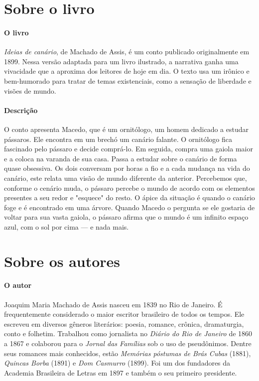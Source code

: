 \documentclass[11pt]{extarticle}
\begin{document}
\section{Sobre o livro}

\paragraph{O livro} \textit{Ideias de canário}, de Machado de Assis, é um conto publicado originalmente em 1899. Nessa versão adaptada para um livro ilustrado, a narrativa ganha uma vivacidade que a aproxima dos leitores de hoje em dia. O texto usa um irônico e bem-humorado para tratar de temas existenciais, como a sensação de liberdade e visões de mundo.

\paragraph{Descrição} O conto apresenta Macedo, que é um ornitólogo, um homem dedicado a estudar pássaros. Ele encontra em um brechó um canário falante. O ornitólogo fica fascinado pelo pássaro e decide comprá-lo. Em seguida, compra uma gaiola maior e a coloca na varanda de sua casa. Passa a estudar sobre o canário de forma quase obsessiva. Os dois conversam por horas a fio e a cada mudança na vida do canário, este relata uma visão de mundo diferente da anterior. Percebemos que, conforme o cenário muda, o pássaro percebe o mundo de acordo com os elementos presentes a seu redor e "esquece" do resto. O ápice da situação é quando o canário foge e é encontrado em uma árvore. Quando Macedo o pergunta se ele gostaria de voltar para sua vasta gaiola, o pássaro afirma que o mundo é um infinito espaço azul, com o sol por cima --- e nada mais.

\section{Sobre os autores}

\paragraph{O autor} Joaquim Maria Machado de Assis nasceu em 1839 no Rio de Janeiro. É frequentemente considerado o maior escritor
brasileiro de todos os tempos. Ele escreveu em diversos gêneros literários: poesia, romance, crônica, dramaturgia, conto e folhetim. Trabalhou como jornalista no \textit{Diário do Rio de Janeiro} de 1860 a 1867 e colaborou para o \textit{Jornal das Famílias} sob o uso de pseudônimos. Dentre seus romances mais conhecidos, estão \textit{Memórias póstumas de Brás Cubas} (1881), \textit{Quincas Borba} (1891) e \textit{Dom Casmurro} (1899). Foi um dos fundadores da Academia Brasileira de Letras em 1897 e também o seu primeiro presidente.
\end{document}
